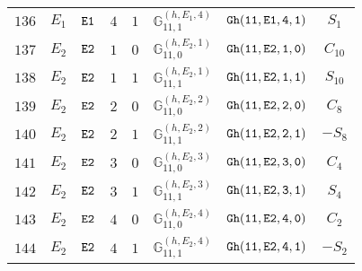 \documentclass[fleqn,8pt]{jsarticle}
\begin{document}
\begin{table}[ht!]
\begin{center}
\begin{tabular}{cccccccc}
$ 136 $ & $ E_{1} $ & $ {\tt E1} $ & $ 4 $ & $ 1 $ & $ \mathbb{G}_{11,1}^{(h,E_{1},4)} $ & $ {\tt Gh(11,E1,4,1)} $ & $ S_{1} $ \\
$ 137 $ & $ E_{2} $ & $ {\tt E2} $ & $ 1 $ & $ 0 $ & $ \mathbb{G}_{11,0}^{(h,E_{2},1)} $ & $ {\tt Gh(11,E2,1,0)} $ & $ C_{10} $ \\
$ 138 $ & $ E_{2} $ & $ {\tt E2} $ & $ 1 $ & $ 1 $ & $ \mathbb{G}_{11,1}^{(h,E_{2},1)} $ & $ {\tt Gh(11,E2,1,1)} $ & $ S_{10} $ \\
$ 139 $ & $ E_{2} $ & $ {\tt E2} $ & $ 2 $ & $ 0 $ & $ \mathbb{G}_{11,0}^{(h,E_{2},2)} $ & $ {\tt Gh(11,E2,2,0)} $ & $ C_{8} $ \\
$ 140 $ & $ E_{2} $ & $ {\tt E2} $ & $ 2 $ & $ 1 $ & $ \mathbb{G}_{11,1}^{(h,E_{2},2)} $ & $ {\tt Gh(11,E2,2,1)} $ & $ - S_{8} $ \\
$ 141 $ & $ E_{2} $ & $ {\tt E2} $ & $ 3 $ & $ 0 $ & $ \mathbb{G}_{11,0}^{(h,E_{2},3)} $ & $ {\tt Gh(11,E2,3,0)} $ & $ C_{4} $ \\
$ 142 $ & $ E_{2} $ & $ {\tt E2} $ & $ 3 $ & $ 1 $ & $ \mathbb{G}_{11,1}^{(h,E_{2},3)} $ & $ {\tt Gh(11,E2,3,1)} $ & $ S_{4} $ \\
$ 143 $ & $ E_{2} $ & $ {\tt E2} $ & $ 4 $ & $ 0 $ & $ \mathbb{G}_{11,0}^{(h,E_{2},4)} $ & $ {\tt Gh(11,E2,4,0)} $ & $ C_{2} $ \\
$ 144 $ & $ E_{2} $ & $ {\tt E2} $ & $ 4 $ & $ 1 $ & $ \mathbb{G}_{11,1}^{(h,E_{2},4)} $ & $ {\tt Gh(11,E2,4,1)} $ & $ - S_{2} $ \\
 \hline \hline
\end{tabular}
\end{center}
\end{table}
\end{document}
